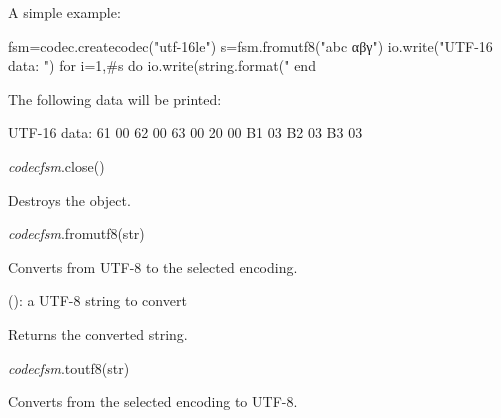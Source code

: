 \documentclass[a4paper,12pt,twoside,extrafontsizes]{memoir}
\begin{document}
A simple example:

\begin{shellcmds}\begin{luacode}
fsm=codec.createcodec("utf-16le")
s=fsm.fromutf8("abc αβγ")
io.write("UTF-16 data: ")
for i=1,#s do
    io.write(string.format("%
end
\end{luacode}\end{shellcmds}

The following data will be printed:

\begin{shellcmds}
UTF-16 data: 61 00 62 00 63 00 20 00 B1 03 B2 03 B3 03
\end{shellcmds}


\begin{luafuncprototype}
\emph{codecfsm}.close()
\end{luafuncprototype}

\begin{funcdescr}
	Destroys the object.
\end{funcdescr}


\begin{luafuncprototype}
\emph{codecfsm}.fromutf8(str)
\end{luafuncprototype}

\begin{funcdescr}
	Converts  from UTF-8 to the selected encoding.
\end{funcdescr}

\begin{funcparams}
	 (): a UTF-8 string to convert
\end{funcparams}

\begin{funcret}
	Returns the converted string.
\end{funcret}


\begin{luafuncprototype}
\emph{codecfsm}.toutf8(str)
\end{luafuncprototype}

\begin{funcdescr}
	Converts  from the selected encoding to UTF-8.
\end{funcdescr}
\end{document}
